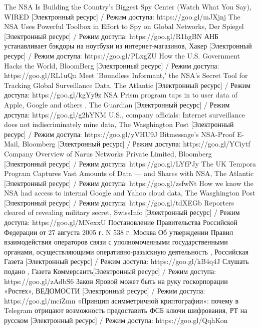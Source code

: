\begin{thebibliography}{}
	  The NSA Is Building the Country’s Biggest Spy Center (Watch What You Say), WIRED [Электронный ресурс] / Режим доступа: https://goo.gl/mJXjnj
	 The NSA Uses Powerful Toolbox in Effort to Spy on Global Networks, Der Spiegel [Электронный ресурс] / Режим доступа: https://goo.gl/R1hgBN
	 АНБ устанавливает бэкдоры на ноутбуки из интернет-магазинов, Хакер [Электронный ресурс] / Режим доступа: https://goo.gl/PLxgZU
	 How the U.S. Government Hacks the World, BloomBerg [Электронный ресурс] / Режим доступа: https://goo.gl/RL1uQn
	 Meet 'Boundless Informant,' the NSA's Secret Tool for Tracking Global Surveillance Data, The Atlantic [Электронный ресурс] / Режим доступа: https://goo.gl/kgYy9z
	NSA Prism program taps in to user data of Apple, Google and others , The Guardian [Электронный ресурс] / Режим доступа: https://goo.gl/g2hYNM
	 U.S., company officials: Internet surveillance does not indiscriminately mine data, The Wasghington Post [Электронный ресурс] / Режим доступа: https://goo.gl/yVHU9J
	 Bitmessage's NSA-Proof E-Mail, Bloomberg [Электронный ресурс] / Режим доступа: https://goo.gl/YCiytf
	 Company Overview of Narus Networks Private Limited, Bloomberg [Электронный ресурс] / Режим доступа: https://goo.gl/LYfPJy
	 The UK Tempora Program Captures Vast Amounts of Data — and Shares with NSA, The Atlantic [Электронный ресурс] / Режим доступа: https://goo.gl/zsfwNt
	 How we know the NSA had access to internal Google and Yahoo cloud data, The Wasghington Post [Электронный ресурс] / Режим доступа: https://goo.gl/tdXEGb
	 Reporters cleared of revealing military secret, SwissInfo [Электронный ресурс] / Режим доступа: https://goo.gl/MNexxU
	 Постановление Правительства Российской Федерации от 27 августа 2005 г. N 538 г. Москва Об утверждении Правил взаимодействия операторов связи с уполномоченными государственными органами, осуществляющими оперативно-разыскную деятельность , Российская Газета  [Электронный ресурс] / Режим доступа: https://goo.gl/kB4q4J
	 Слушать подано ,  Газета  Коммерсантъ[Электронный ресурс] / Режим доступа: https://goo.gl/zAdbS6
	 Закон Яровой может быть на руку госкорпорации «Ростех»,    ВЕДОМОСТИ [Электронный ресурс] / Режим доступа: https://goo.gl/mciZmn
	 «Принцип асимметричной криптографии»: почему в Telegram отрицают возможность предоставить ФСБ ключи шифрования,    РТ на русском [Электронный ресурс] / Режим доступа: https://goo.gl/QqhKon
\end{thebibliography}